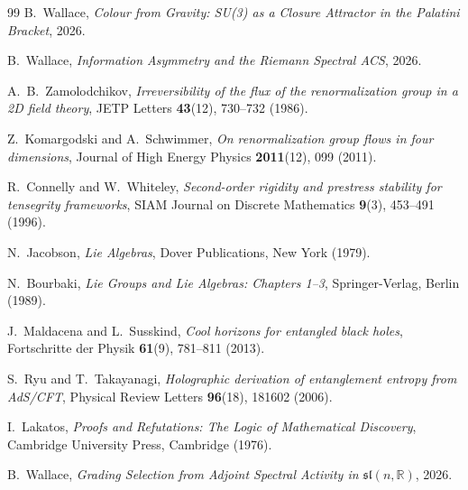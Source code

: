 \documentclass[11pt,a4paper]{article}
\theoremstyle{plain}
\theoremstyle{definition}
\theoremstyle{remark}
\begin{document}
\begin{thebibliography}{99}
B.~Wallace,
\textit{Colour from Gravity: SU(3) as a Closure Attractor in the Palatini Bracket},
2026.

B.~Wallace,
\textit{Information Asymmetry and the Riemann Spectral ACS},
2026.

A.~B.~Zamolodchikov,
\textit{Irreversibility of the flux of the renormalization group in a 2D field theory},
JETP Letters \textbf{43}(12), 730--732 (1986).

Z.~Komargodski and A.~Schwimmer,
\textit{On renormalization group flows in four dimensions},
Journal of High Energy Physics \textbf{2011}(12), 099 (2011).

R.~Connelly and W.~Whiteley,
\textit{Second-order rigidity and prestress stability for tensegrity frameworks},
SIAM Journal on Discrete Mathematics \textbf{9}(3), 453--491 (1996).

N.~Jacobson,
\textit{Lie Algebras},
Dover Publications, New York (1979).

N.~Bourbaki,
\textit{Lie Groups and Lie Algebras: Chapters 1--3},
Springer-Verlag, Berlin (1989).

J.~Maldacena and L.~Susskind,
\textit{Cool horizons for entangled black holes},
Fortschritte der Physik \textbf{61}(9), 781--811 (2013).

S.~Ryu and T.~Takayanagi,
\textit{Holographic derivation of entanglement entropy from AdS/CFT},
Physical Review Letters \textbf{96}(18), 181602 (2006).

I.~Lakatos,
\textit{Proofs and Refutations: The Logic of Mathematical Discovery},
Cambridge University Press, Cambridge (1976).

B.~Wallace,
\textit{Grading Selection from Adjoint Spectral Activity
in $\mathfrak{sl}(n,\mathbb{R})$},
2026.

\end{thebibliography}
\end{document}
